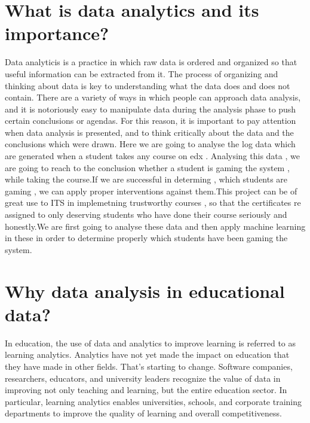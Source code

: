 \documentclass[a4paper,12pt,oneside]{sphinxmanual}
\begin{document}
\section{What is data analytics and its importance?}
\label{document:what-is-data-analytics-and-its-importance}
Data analyticis is a practice in which raw data is ordered and organized so that useful information can be extracted from it. The process of organizing and thinking about data is key to understanding what the data does and does not contain. There are a variety of ways in which people can approach data analysis, and it is notoriously easy to manipulate data during the analysis phase to push certain conclusions or agendas. For this reason, it is important to pay attention when data analysis is presented, and to think critically about the data and the conclusions which were drawn.
Here we are going to analyse the log data which are generated when a student takes any course on edx . Analysing this data , we are going to reach to the conclusion whether a student is gaming the system , while taking the course.If we are successful in determing , which students are gaming , we can apply proper interventions against them.This project can be of great use to ITS in implemetning trustworthy courses , so that the certificates re assigned to only deserving students who have done their course seriously and honestly.We are first going to analyse these data and then apply machine learning in these in order to determine properly which students have been gaming the system.


\section{Why data analysis in educational data?}
\label{document:why-data-analysis-in-educational-data}
In education, the use of data and analytics to improve learning is referred to as learning analytics. Analytics have not yet made the impact on education that they have made in other fields. That’s starting to change. Software companies, researchers, educators, and university leaders recognize the value of data in improving not only teaching and learning, but the entire education sector. In particular, learning analytics enables universities, schools, and corporate training departments to improve the quality of learning and overall competitiveness.
\end{document}

